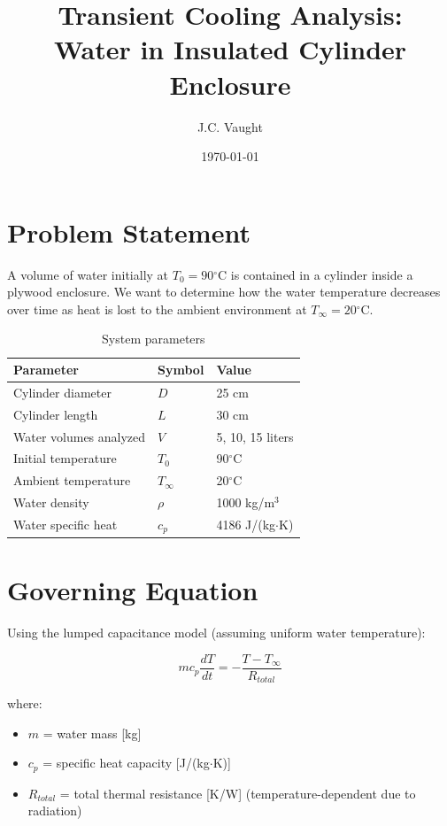 \documentclass[11pt]{article}
\title{\textbf{Transient Cooling Analysis:\\Water in Insulated Cylinder Enclosure}}
\author{J.C. Vaught}
\date{\today}
\newcommand{\degC}{$^\circ$C}
\begin{document}
\maketitle

\section{Problem Statement}

A volume of water initially at $T_0 = 90$\degC{} is contained in a cylinder inside a plywood enclosure. We want to determine how the water temperature decreases over time as heat is lost to the ambient environment at $T_\infty = 20$\degC.

\begin{table}[H]
\centering
\caption{System parameters}
\begin{tabular}{lll}
\toprule
\textbf{Parameter} & \textbf{Symbol} & \textbf{Value} \\
\midrule
Cylinder diameter & $D$ & 25 cm \\
Cylinder length & $L$ & 30 cm \\
Water volumes analyzed & $V$ & 5, 10, 15 liters \\
Initial temperature & $T_0$ & 90\degC \\
Ambient temperature & $T_\infty$ & 20\degC \\
\midrule
Water density & $\rho$ & 1000 kg/m$^3$ \\
Water specific heat & $c_p$ & 4186 J/(kg$\cdot$K) \\
\bottomrule
\end{tabular}
\end{table}

\section{Governing Equation}

Using the lumped capacitance model (assuming uniform water temperature):

\begin{equation}
    m c_p \frac{dT}{dt} = -\frac{T - T_\infty}{R_{total}}
\end{equation}

where:
\begin{itemize}
    \item $m$ = water mass [kg]
    \item $c_p$ = specific heat capacity [J/(kg$\cdot$K)]
    \item $R_{total}$ = total thermal resistance [K/W] (temperature-dependent due to radiation)
\end{itemize}
\end{document}
